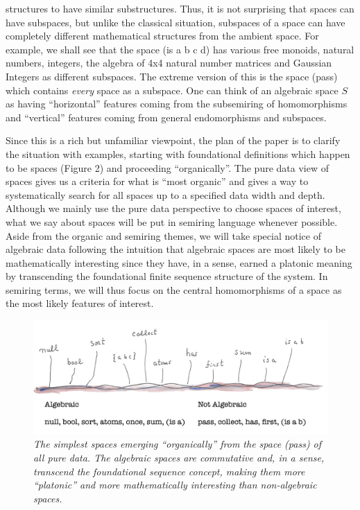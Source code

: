 \documentclass[11pt]{article}
\begin{document}
\begin{itemize}
{structures to have similar substructures.  Thus, it is not surprising that spaces can have subspaces, but unlike the classical situation, 
subspaces of a space can have completely different mathematical structures from the ambient space.  For example, we shall see that 
the space (is a b c d) has various free monoids, natural numbers, integers, the algebra of 4x4 natural number matrices and 
Gaussian Integers as different subspaces.  The extreme version of this is the space (pass) which contains {\it every} space as a subspace.  One can think of 
an algebraic space $S$ as having ``horizontal'' features coming from the subsemiring of homomorphisms and ``vertical'' features 
coming from general endomorphisms and subspaces.} 
\end{itemize}
Since this is a rich but unfamiliar viewpoint, the plan of the paper is to clarify the situation with examples, starting 
with foundational definitions which happen to be spaces (Figure 2) and proceeding ``organically''. 
The pure data view of spaces gives us a criteria for what is ``most organic'' and gives a way to systematically 
search for all spaces up to a specified data width and depth.  Although we mainly use the pure data perspective to 
choose spaces of interest, what we say about spaces will be put in semiring language whenever possible.  Aside from 
the organic and semiring themes, we will take special notice of algebraic data following the intuition that algebraic 
spaces are most likely to be mathematically interesting since they have, in a sense, earned a platonic meaning by 
transcending the foundational finite sequence structure of the system.  In semiring terms, we will thus focus on
the central homomorphisms of a space as the most likely features of interest. 

\begin{figure}[h]
\centering
\includegraphics[width=1.0\textwidth]{start-garden.png}
\caption{{\it The simplest spaces emerging ``organically'' from the space (pass) of all pure data.  The algebraic spaces are commutative and, 
in a sense, transcend the foundational sequence concept, making them more ``platonic'' and more mathematically interesting than non-algebraic spaces.}} 
\end{figure}
\end{document}
